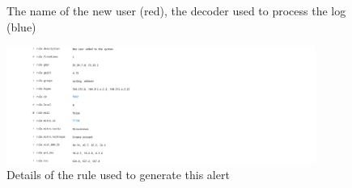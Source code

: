 \begin{enumerate}
\begin{figure} [H]
    \caption{The name of the new user (red), the decoder used to process the log (blue)}
    \end{figure}
    \begin{figure} [H]
    \centering
    \includegraphics[width=0.9\textwidth]{images/log-data/6.png}
    \caption{Details of the rule used to generate this alert}
    \end{figure}
\end{enumerate}